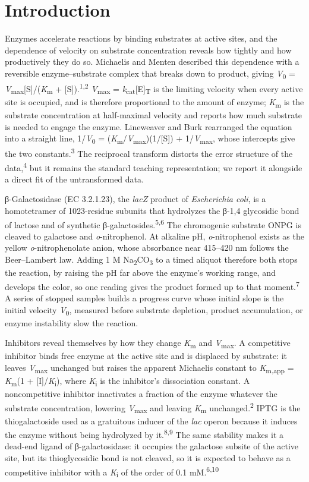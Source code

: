 \documentclass[9pt,twocolumn]{extarticle}
\newcommand{\cit}[1]{\textsuperscript{#1}}
\newcommand{\Km}{\textit{K}\textsubscript{m}}
\newcommand{\Kmapp}{\textit{K}\textsubscript{m,app}}
\newcommand{\Vmax}{\textit{V}\textsubscript{max}}
\newcommand{\Vo}{\textit{V}\textsubscript{0}}
\newcommand{\Ki}{\textit{K}\textsubscript{i}}
\newcommand{\kcat}{\textit{k}\textsubscript{cat}}
\newcommand{\Ecoli}{\textit{Escherichia coli}}
\newcommand{\lac}{\textit{lac}}
\newcommand{\lacZ}{\textit{lacZ}}
\newcommand{\onp}{\textit{o}-nitrophenol}
\newcommand{\dash}{–}
\begin{document}
\section{Introduction}
Enzymes accelerate reactions by binding substrates at active sites, and the dependence of velocity on substrate concentration reveals how tightly and how productively they do so. Michaelis and Menten described this dependence with a reversible enzyme\dash substrate complex that breaks down to product, giving \Vo{} = \Vmax[S]/(\Km{} + [S]).\cit{1,2} \Vmax{} = \kcat[E]\textsubscript{T} is the limiting velocity when every active site is occupied, and is therefore proportional to the amount of enzyme; \Km{} is the substrate concentration at half-maximal velocity and reports how much substrate is needed to engage the enzyme. Lineweaver and Burk rearranged the equation into a straight line, 1/\Vo{} = (\Km/\Vmax)(1/[S]) + 1/\Vmax, whose intercepts give the two constants.\cit{3} The reciprocal transform distorts the error structure of the data,\cit{4} but it remains the standard teaching representation; we report it alongside a direct fit of the untransformed data.

β-Galactosidase (EC 3.2.1.23), the \lacZ{} product of \Ecoli, is a homotetramer of 1023-residue subunits that hydrolyzes the β-1,4 glycosidic bond of lactose and of synthetic β-galactosides.\cit{5,6} The chromogenic substrate ONPG is cleaved to galactose and \onp. At alkaline pH, \onp{} exists as the yellow \textit{o}-nitrophenolate anion, whose absorbance near 415\dash 420 nm follows the Beer\dash Lambert law. Adding 1 M Na\textsubscript{2}CO\textsubscript{3} to a timed aliquot therefore both stops the reaction, by raising the pH far above the enzyme's working range, and develops the color, so one reading gives the product formed up to that moment.\cit{7} A series of stopped samples builds a progress curve whose initial slope is the initial velocity \Vo, measured before substrate depletion, product accumulation, or enzyme instability slow the reaction.

Inhibitors reveal themselves by how they change \Km{} and \Vmax. A competitive inhibitor binds free enzyme at the active site and is displaced by substrate: it leaves \Vmax{} unchanged but raises the apparent Michaelis constant to \Kmapp{} = \Km(1 + [I]/\Ki), where \Ki{} is the inhibitor's dissociation constant. A noncompetitive inhibitor inactivates a fraction of the enzyme whatever the substrate concentration, lowering \Vmax{} and leaving \Km{} unchanged.\cit{2} IPTG is the thiogalactoside used as a gratuitous inducer of the \lac{} operon because it induces the enzyme without being hydrolyzed by it.\cit{8,9} The same stability makes it a dead-end ligand of β-galactosidase: it occupies the galactose subsite of the active site, but its thioglycosidic bond is not cleaved, so it is expected to behave as a competitive inhibitor with a \Ki{} of the order of 0.1 mM.\cit{6,10}
\end{document}
